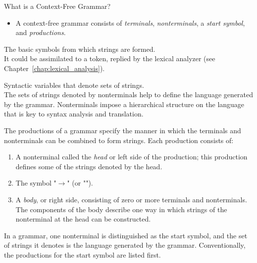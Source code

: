 \begin{bibunit}[apalike]
\begin{frame}[allowframebreaks]{What is a Context-Free Grammar?}
	\begin{itemize}
	\item A context-free grammar consists of \emph{terminals}, \emph{nonterminals}, a \emph{start symbol}, and \emph{productions}.
	\end{itemize}
	\begin{definition}
		The basic symbols from which strings are formed. \\
		It could be assimilated to a token, replied by the lexical analyzer (see Chapter~\ref{chap:lexical_analysis}).
	\end{definition}
	\begin{definition}[Nonterminals]
		Syntactic variables that denote sets of strings. \\
		The sets of strings denoted by nonterminals help to define the language generated by the grammar. Nonterminals impose a hierarchical structure on the language that is key to syntax analysis and translation.
	\end{definition}
	\begin{definition}[Production]
		The productions of a grammar specify the manner in which the terminals and nonterminals can be combined to form strings. Each production consists of: \begin{enumerate}
		\item A nonterminal called the \emph{head} or left side of the production; this production defines some of the strings denoted by the head.
		\item The symbol "$\rightarrow$" (or "\code{\string:\string:\string=}").
		\item A \emph{body}, or right side, consisting of zero or more terminals and nonterminals. The components of the body describe one way in which strings of the nonterminal at the head can be constructed.
		\end{enumerate}
	\end{definition}
	\begin{definition}
		In a grammar, one nonterminal is distinguished as the start symbol, and the set of strings it denotes is the language generated by the grammar. Conventionally, the productions for the start symbol are listed first.
	\end{definition}
\end{frame}


\end{bibunit}
